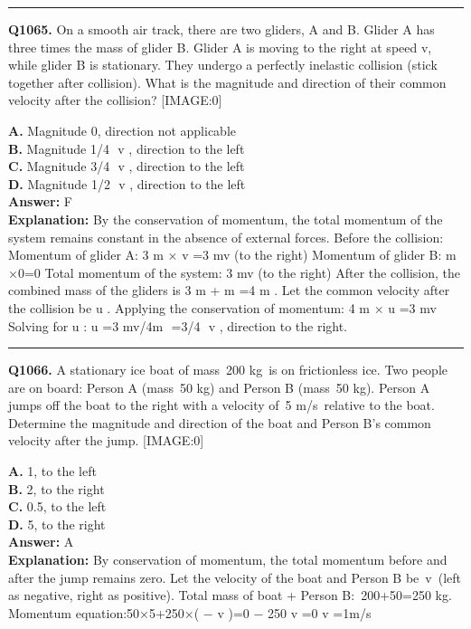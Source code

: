 \documentclass[12pt]{article}
\begin{document}
\hrule
\vspace{1em}


\noindent
\textbf{Q1065.} On a smooth air track, there are two gliders, A and B. Glider A has three times the mass of glider B. Glider A is moving to the right at speed v, while glider B is stationary. They undergo a perfectly inelastic collision (stick together after collision). What is the magnitude and direction of their common velocity after the collision?
[IMAGE:0]



\textbf{A.} Magnitude 0, direction not applicable \\
\textbf{B.} Magnitude 1/4
​
v
, direction to the left \\
\textbf{C.} Magnitude 3/4
​
v
, direction to the left \\
\textbf{D.} Magnitude 1/2
​
v
, direction to the left \\

\textbf{Answer:} F \\
\textbf{Explanation:} By the conservation of momentum, the total momentum of the system remains constant in the absence of external forces. Before the collision:
Momentum of glider A: 3
m
×
v
=3
mv
(to the right)
Momentum of glider B:
m
×0=0
Total momentum of the system: 3
mv
(to the right)
After the collision, the combined mass of the gliders is 3
m
+
m
=4
m
. Let the common velocity after the collision be
u
. Applying the conservation of momentum:
4
m
×
u
=3
mv
Solving for
u
:
u
=3
mv/4m
​
=3/4
​
v
, direction to the right.

\hrule
\vspace{1em}


\noindent
\textbf{Q1066.} A stationary ice boat of mass 200
kg is on frictionless ice. Two people are on board: Person A (mass 50
kg) and Person B (mass 50
kg). Person A jumps off the boat to the right with a velocity of 5
m/s relative to the boat. Determine the magnitude and direction of the boat and Person B’s common velocity after the jump.
[IMAGE:0]



\textbf{A.} 1, to the left \\
\textbf{B.} 2, to the right \\
\textbf{C.} 0.5, to the left \\
\textbf{D.} 5, to the right \\

\textbf{Answer:} A \\
\textbf{Explanation:} By conservation of momentum, the total momentum before and after the jump remains zero. Let the velocity of the boat and Person B be v (left as negative, right as positive).
Total mass of boat + Person B: 200+50=250
kg.
Momentum equation:50×5+250×(
−
v
)=0
−
250
v
=0
\implies 
v
=1m/s
\end{document}

